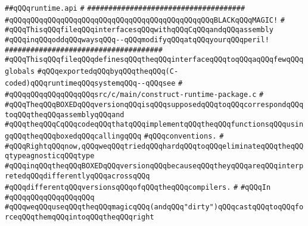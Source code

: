\label{src/lib/core/init/runtime.api}
\verb|##qQQqruntime.api|\newline
\verb|#|\newline
\verb|#####################################|\newline
\verb|#qQQqqQQqqQQqqQQqqQQqqQQqqQQqqQQqqQQqqQQqqQQqqQQqBLACKqQQqMAGIC!|\newline
\verb|#|\newline
\verb|#qQQqThisqQQqfileqQQqinterfacesqQQqwithqQQqCqQQqandqQQqassembly|\newline
\verb|#qQQqinqQQqoddqQQqwaysqQQq--qQQqmodifyqQQqatqQQqyourqQQqperil!|\newline
\verb|#####################################|\newline
\newline
\newline
\verb|#qQQqThisqQQqfileqQQqdefinesqQQqtheqQQqinterfaceqQQqtoqQQqaqQQqfewqQQqglobals|\newline
\verb|#qQQqexportedqQQqbyqQQqtheqQQq(C-coded)qQQqruntimeqQQqsystemqQQq--qQQqsee|\newline
\verb|#|\newline
\verb|#qQQqqQQqqQQqqQQqqQQqsrc/c/main/construct-runtime-package.c|\newline
\verb|#|\newline
\verb|#qQQqTheqQQqBOXEDqQQqversionqQQqisqQQqsupposedqQQqtoqQQqcorrespondqQQqtoqQQqtheqQQqassemblyqQQqand|\newline
\verb|#qQQqtheqQQqCqQQqcodeqQQqthatqQQqimplementqQQqtheqQQqfunctionsqQQqusingqQQqtheqQQqboxedqQQqcallingqQQq|\newline
\verb|#qQQqconventions.|\newline
\verb|#|\newline
\verb|#qQQqRightqQQqnow,qQQqweqQQqtriedqQQqhardqQQqtoqQQqeliminateqQQqtheqQQqtypeagnosticqQQqtype|\newline
\verb|#qQQqinqQQqtheqQQqBOXEDqQQqversionqQQqbecauseqQQqtheyqQQqareqQQqinterpretedqQQqdifferentlyqQQqacrossqQQq|\newline
\verb|#qQQqdifferentqQQqversionsqQQqofqQQqtheqQQqcompilers.|\newline
\verb|#|\newline
\verb|#qQQqIn|\newline
\verb|#qQQqqQQqqQQqqQQqqQQq|\newline
\verb|#qQQqweqQQquseqQQqtheqQQqmagicqQQq(andqQQq"dirty")qQQqcastqQQqtoqQQqforceqQQqthemqQQqintoqQQqtheqQQqright|\newline
